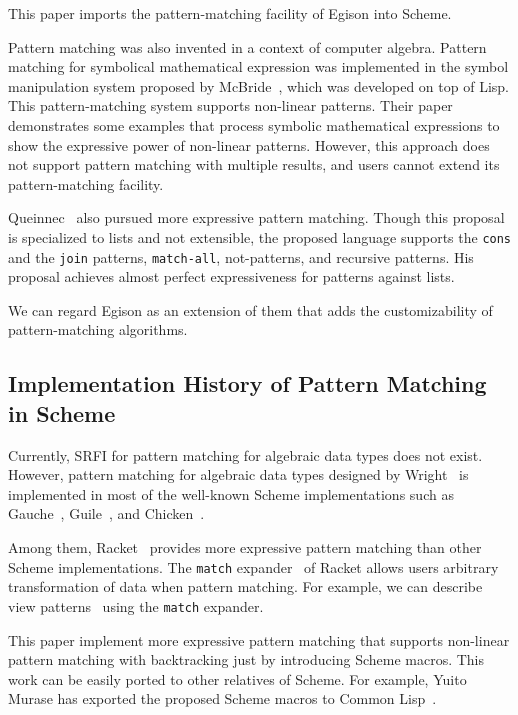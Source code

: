 \documentclass[acmlarge]{acmart}
\begin{document}
\noindent This paper imports the pattern-matching facility of Egison into Scheme.

\medskip

Pattern matching was also invented in a context of computer algebra.
Pattern matching for symbolical mathematical expression was implemented in the symbol manipulation system proposed by McBride~\cite{mcbride1969symbol}, which was developed on top of Lisp.
This pattern-matching system supports non-linear patterns.
Their paper demonstrates some examples that process symbolic mathematical expressions to show the expressive power of non-linear patterns.
However, this approach does not support pattern matching with multiple results, and users cannot extend its pattern-matching facility.

Queinnec~\cite{queinnec1990compilation} also pursued more expressive pattern matching.
Though this proposal is specialized to lists and not extensible, the proposed language supports the \texttt{cons} and the \texttt{join} patterns, \texttt{match-all}, not-patterns, and recursive patterns.
His proposal achieves almost perfect expressiveness for patterns against lists.

We can regard Egison as an extension of them that adds the customizability of pattern-matching algorithms.

\subsection{Implementation History of Pattern Matching in Scheme}\label{history2}


Currently, SRFI for pattern matching for algebraic data types does not exist.
However, pattern matching for algebraic data types designed by Wright~\cite{wright1993pattern} is implemented in most of the well-known Scheme implementations such as Gauche~\cite{gauchePM}, Guile~\cite{guilePM}, and Chicken~\cite{chickenPM}.

Among them, Racket~\cite{racketWeb} provides more expressive pattern matching than other Scheme implementations.
The \texttt{match} expander~\cite{tobin2011extensible} of Racket allows users arbitrary transformation of data when pattern matching.
For example, we can describe view patterns~\cite{wadler1987views} using the \texttt{match} expander.

This paper implement more expressive pattern matching that supports non-linear pattern matching with backtracking just by introducing Scheme macros.
This work can be easily ported to other relatives of Scheme.
For example, Yuito Murase has exported the proposed Scheme macros to Common Lisp~\cite{egisonLisp}.
\end{document}
